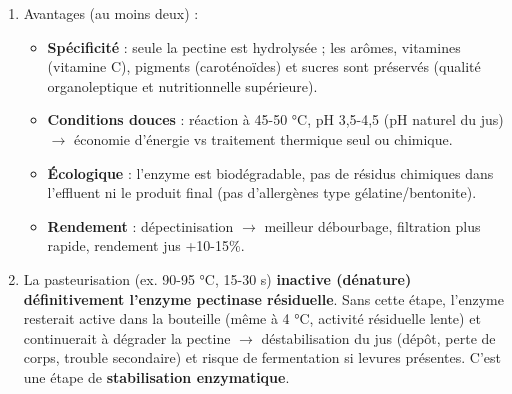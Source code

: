 \documentclass[11pt]{article}
\begin{document}
\begin{exoresolu}
\begin{enumerate}
\begin{itemize}
\end{itemize}
\item Avantages (au moins deux) :
\begin{itemize}
\item \textbf{Spécificité} : seule la pectine est hydrolysée ; les arômes, vitamines (vitamine C), pigments (caroténoïdes) et sucres sont préservés (qualité organoleptique et nutritionnelle supérieure).
\item \textbf{Conditions douces} : réaction à 45-50 °C, pH 3,5-4,5 (pH naturel du jus) $\rightarrow$ économie d'énergie vs traitement thermique seul ou chimique.
\item \textbf{Écologique} : l'enzyme est biodégradable, pas de résidus chimiques dans l'effluent ni le produit final (pas d'allergènes type gélatine/bentonite).
\item \textbf{Rendement} : dépectinisation $\rightarrow$ meilleur débourbage, filtration plus rapide, rendement jus +10-15\%.
\end{itemize}
\item La pasteurisation (ex. 90-95 °C, 15-30 s) \textbf{inactive (dénature) définitivement l'enzyme pectinase résiduelle}. Sans cette étape, l'enzyme resterait active dans la bouteille (même à 4 °C, activité résiduelle lente) et continuerait à dégrader la pectine $\rightarrow$ déstabilisation du jus (dépôt, perte de corps, trouble secondaire) et risque de fermentation si levures présentes. C'est une étape de \textbf{stabilisation enzymatique}.
\end{enumerate}
\end{exoresolu}
\end{document}
